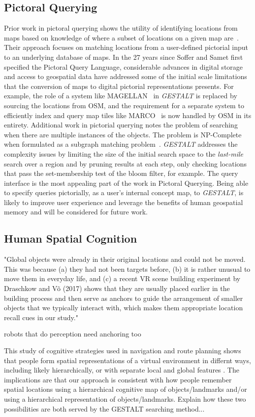 \subsection{Pictoral Querying}
Prior work in pictoral querying shows the utility of identifying locations from maps based on knowledge of where a subset of locations on a given map are~\cite{Soffer1997}. 
Their approach focuses on matching locations from a user-defined pictorial input to an underlying database of maps. In the 27 years since Soffer and Samet first specified the Pictoral Query Language, considerable advances in digital storage and access to geospatial data have addressed some of the initial scale limitations that the conversion of maps to digital pictorial representations presents. For example, the role of a system like MAGELLAN~\cite{Samet1998} in \textit{GESTALT} is replaced by sourcing the locations from OSM, and the requirement for a separate system to efficiently index and query map tiles like MARCO~\cite{Samet1996} is now handled by OSM in its entirety. 
Additional work in pictorial querying notes the problem of searching when there are multiple instances of the objects. The problem is NP-Complete when formulated as a subgraph matching problem~\cite{Folkers2000}. 
\textit{GESTALT} addresses the complexity issues by limiting the size of the initial search space to the \textit{last-mile} search over a region and by pruning results at each step, only checking locations that pass the set-membership test of the bloom filter, for example. 
The query interface is the most appealing part of the work in Pictoral Querying. Being able to specify queries pictorially, as a user's internal concept map, to \textit{GESTALT}, is likely to improve user experience and leverage the benefits of human geospatial memory and will be considered for future work. 

\subsection{Human Spatial Cognition}
 "Global objects were already in their original locations and could not be moved. This was because (a) they had not been targets before, (b) it is rather unusual to move them in everyday life, and (c) a recent VR scene building experiment by Draschkow and Võ (2017) shows that they are usually placed earlier in the building process and then serve as anchors to guide the arrangement of smaller objects that we typically interact with, which makes them appropriate location recall cues in our study." \cite{Helbing2020}

 robots that do perception need anchoring too \cite{Oliveira2016}

  This study of cognitive strategies used in navigation and route planning shows that people form spatial representations of a virtual environment in differnt ways, including likely hierarchically, or with separate local and global features \cite{Weisberg2016}. The implications are that our approach is consistent with how people remember spatial locations using a hierarchical cognitive map of objects/landmarks and/or using a hierarchical representation of objects/landmarks. Explain how these two possibilities are both served by the GESTALT searching method...